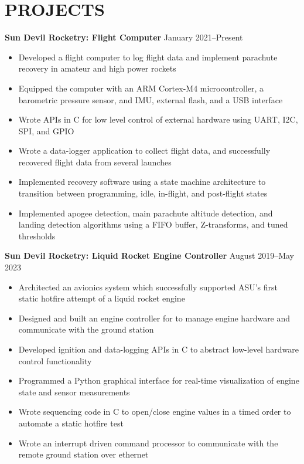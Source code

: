 \documentclass{article}
\begin{document}
\section{PROJECTS}
\textbf{Sun Devil Rocketry: Flight Computer}
\hfill
\vspace{0.5em}
January 2021--Present
\begin{itemize}
\item{Developed a flight computer to log flight data and implement parachute recovery in amateur and high power rockets}
\item{Equipped the computer with an ARM Cortex-M4 microcontroller, a barometric pressure sensor, and IMU, external flash, and a USB interface}
\item{Wrote APIs in C for low level control of external hardware using UART, I2C, SPI, and GPIO}
\item{Wrote a data-logger application to collect flight data, and successfully recovered flight data from several launches}
\item{Implemented recovery software using a state machine architecture to transition between programming, idle, in-flight, and post-flight states}
\item{Implemented apogee detection, main parachute altitude detection, and landing detection algorithms using a FIFO buffer, Z-transforms, and tuned thresholds}
\end{itemize}
\vspace{1em}
\textbf{Sun Devil Rocketry: Liquid Rocket Engine Controller}
\hfill
\vspace{0.5em}
August 2019--May 2023
\begin{itemize}
\item{Architected an avionics system which successfully supported ASU's first static hotfire attempt of a liquid rocket engine}
\item{Designed and built an engine controller for to manage engine hardware and communicate with the ground station}
\item{Developed ignition and data-logging APIs in C to abstract low-level hardware control functionality}
\item{Programmed a Python graphical interface for real-time visualization of engine state and sensor measurements}
\item{Wrote sequencing code in C to open/close engine values in a timed order to automate a static hotfire test }
\item{Wrote an interrupt driven command processor to communicate with the remote ground station over ethernet}
\end{itemize}
\vspace{0.5em}
\thispagestyle{empty}
\end{document}
